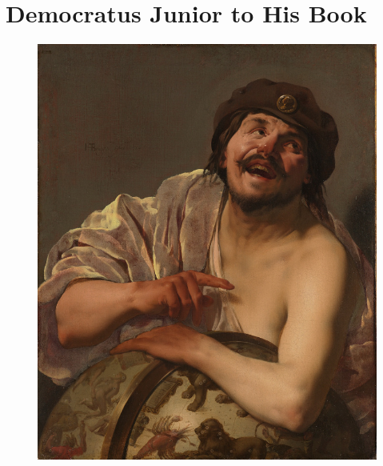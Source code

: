 \chapter{Democratus Junior to His Book}
\begin{figure}[h]
\centering
\includegraphics[keepaspectratio,width=\textwidth]{figures/democritus-small.jpg}
    \caption*{\scriptsize
    }
    \label{fig:democritus}
\end{figure}
\settowidth{\versewidth}{Should known or unknown student, freed from strife}
